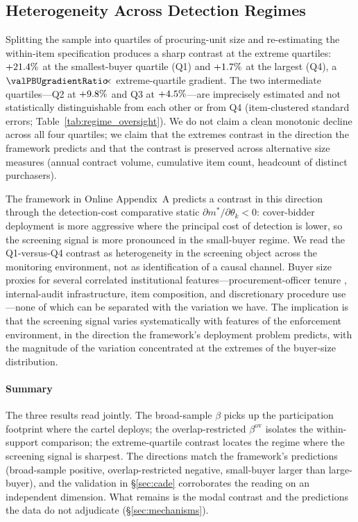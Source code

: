 \subsection{Heterogeneity Across Detection Regimes}
\label{sec:results_oversight}

Splitting the sample into quartiles of procuring-unit size and
re-estimating the within-item specification produces a sharp
contrast at the extreme quartiles: $+21.4\%$ at
the smallest-buyer quartile (Q1) and $+1.7\%$ at
the largest (Q4), a $\valPBUgradientRatio\!\!\times$
extreme-quartile gradient. The two intermediate quartiles---Q2
at $+9.8\%$ and Q3 at
$+4.5\%$---are imprecisely estimated and not
statistically distinguishable from each other or from Q4
(item-clustered standard errors;
Table~\ref{tab:regime_oversight}). We do not claim a clean
monotonic decline across all four quartiles; we claim that the
extremes contrast in the direction the framework predicts and
that the contrast is preserved across alternative size measures
(annual contract volume, cumulative item count, headcount of
distinct purchasers).

The framework in Online Appendix~A predicts a contrast in this
direction through the detection-cost comparative static
$\partial m^*/\partial \theta_k < 0$: cover-bidder deployment
is more aggressive where the principal cost of detection is
lower, so the screening signal is more pronounced in the
small-buyer regime. We read the Q1-versus-Q4 contrast as
heterogeneity in the screening object across the monitoring
environment, not as identification of a causal channel. Buyer
size proxies for several correlated institutional features---procurement-officer
tenure \citep{coviello2017tenure}, internal-audit
infrastructure, item composition, and discretionary procedure
use \citep{decarolis2020rules,decarolis2017corruption}---none of
which can be separated with the variation we have. The
implication is that the screening signal varies systematically
with features of the enforcement environment, in the direction
the framework's deployment problem predicts, with the magnitude
of the variation concentrated at the extremes of the
buyer-size distribution.

\paragraph*{Summary} The three results read jointly. The
broad-sample $\beta$ picks up the participation footprint where
the cartel deploys; the overlap-restricted $\beta^{\text{ov}}$
isolates the within-support comparison; the extreme-quartile
contrast locates the regime where the screening signal is
sharpest. The directions match the framework's predictions
(broad-sample positive, overlap-restricted negative, small-buyer
larger than large-buyer), and the validation in §\ref{sec:cade}
corroborates the reading on an independent dimension. What
remains is the modal contrast and the predictions the data do
not adjudicate (§\ref{sec:mechanisms}).

